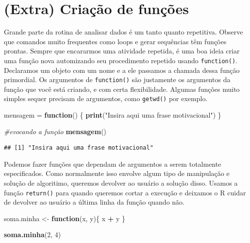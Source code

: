 \documentclass[
]{article}
\newenvironment{Shaded}{\begin{snugshade}}{\end{snugshade}}
\newcommand{\CommentTok}[1]{\textcolor[rgb]{0.56,0.35,0.01}{\textit{#1}}}
\newcommand{\ControlFlowTok}[1]{\textcolor[rgb]{0.13,0.29,0.53}{\textbf{#1}}}
\newcommand{\DecValTok}[1]{\textcolor[rgb]{0.00,0.00,0.81}{#1}}
\newcommand{\KeywordTok}[1]{\textcolor[rgb]{0.13,0.29,0.53}{\textbf{#1}}}
\newcommand{\NormalTok}[1]{#1}
\newcommand{\OperatorTok}[1]{\textcolor[rgb]{0.81,0.36,0.00}{\textbf{#1}}}
\newcommand{\StringTok}[1]{\textcolor[rgb]{0.31,0.60,0.02}{#1}}
\begin{document}
\hypertarget{extra-criauxe7uxe3o-de-funuxe7uxf5es}{%
\section{(Extra) Criação de
funções}\label{extra-criauxe7uxe3o-de-funuxe7uxf5es}}

Grande parte da rotina de analisar dados é um tanto quanto repetitiva.
Observe que comandos muito frequentes como loops e gerar sequências têm
funções prontas. Sempre que encararmos uma atividade repetida, é uma boa
ideia criar uma função nova automizando seu procedimento repetido usando
\texttt{function()}. Declaramos um objeto com um nome e a ele passamos a
chamada dessa função primordial. Os argumentos de \texttt{function()}
são justamente os argumentos da função que você está criando, e com
certa flexibilidade. Algumas funções muito simples sequer precisam de
argumentos, como \texttt{getwd()} por exemplo.

\begin{Shaded}
\begin{Highlighting}[]
\NormalTok{mensagem =}\StringTok{ }\ControlFlowTok{function}\NormalTok{() \{}
  \KeywordTok{print}\NormalTok{(}\StringTok{"Insira aqui uma frase motivacional"}\NormalTok{)}
\NormalTok{\}}

\CommentTok{#evocando a função}
\KeywordTok{mensagem}\NormalTok{()}
\end{Highlighting}
\end{Shaded}

\begin{verbatim}
## [1] "Insira aqui uma frase motivacional"
\end{verbatim}

Podemos fazer funções que dependam de argumentos a serem totalmente
especificados. Como normalmente isso envolve algum tipo de manipulação e
solução de algoritimo, queremos devolver ao usuário a solução disso.
Usamos a função \texttt{return()} para quando queremos cortar a execução
e deixamos o R cuidar de devolver ao usuário a última linha da função
quando não.

\begin{Shaded}
\begin{Highlighting}[]
\NormalTok{soma.minha <-}\StringTok{ }\ControlFlowTok{function}\NormalTok{(x, y)\{}
\NormalTok{  x }\OperatorTok{+}\StringTok{ }\NormalTok{y}
\NormalTok{\}}

\KeywordTok{soma.minha}\NormalTok{(}\DecValTok{2}\NormalTok{, }\DecValTok{4}\NormalTok{)}
\end{Highlighting}
\end{Shaded}
\end{document}
